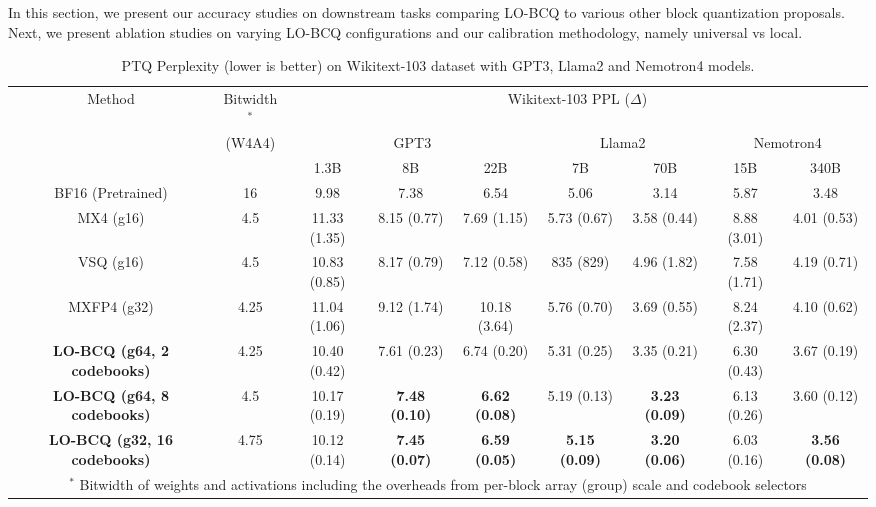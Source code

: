 In this section, we present our accuracy studies on downstream tasks comparing LO-BCQ to various other block quantization proposals. Next, we present ablation studies on varying LO-BCQ configurations and our calibration methodology, namely universal vs local.

\begin{table*} [!t]\scriptsize
\begin{center}
\caption{\label{tab:wiki3_ppl} \small PTQ Perplexity (lower is better) on Wikitext-103 dataset with GPT3, Llama2 and Nemotron4 models.}
\begin{tabular}{|c|c||c|c|c||c|c||c|c||} 
\hline
 Method & Bitwidth$^*$ & \multicolumn{7}{c||}{Wikitext-103 PPL ($\Delta$)} \\
  & (W4A4) &\multicolumn{3}{c||}{\cellcolor[gray]{0.95} GPT3} & \multicolumn{2}{c||}{\cellcolor[gray]{0.95} Llama2} & \multicolumn{2}{c||}{\cellcolor[gray]{0.95} Nemotron4} \\

 & & \cellcolor[gray]{0.95} 1.3B & \cellcolor[gray]{0.95} 8B & \cellcolor[gray]{0.95} 22B & \cellcolor[gray]{0.95} 7B & \cellcolor[gray]{0.95} 70B & \cellcolor[gray]{0.95} 15B & \cellcolor[gray]{0.95} 340B \\
 \hline
 BF16 (Pretrained) & 16 &  9.98 & 7.38 & 6.54 & 5.06 & 3.14 & 5.87 & 3.48 \\
\hline
MX4 (g16) & 4.5  & 11.33 (1.35) & 8.15 (0.77) & 7.69 (1.15) & 5.73 (0.67) & 3.58 (0.44) & 8.88 (3.01) & 4.01 (0.53) \\
VSQ (g16) & 4.5 & 10.83 (0.85) & 8.17 (0.79) & 7.12 (0.58) & 835 (829) & 4.96 (1.82) & 7.58 (1.71) & 4.19 (0.71) \\
MXFP4 (g32) & 4.25 & 11.04 (1.06) & 9.12 (1.74) & 10.18 (3.64) & 5.76 (0.70)& 3.69 (0.55) & 8.24 (2.37) & 4.10 (0.62) \\
\rowcolor[gray]{0.9} \textbf{LO-BCQ (g64, 2 codebooks)} & 4.25 & 10.40 (0.42) & 7.61 (0.23) & 6.74 (0.20) & 5.31 (0.25) & 3.35 (0.21) & 6.30 (0.43) & 3.67 (0.19) \\
\rowcolor[gray]{0.9} \textbf{LO-BCQ (g64, 8 codebooks)} & 4.5 & 10.17 (0.19) & \textbf{7.48 (0.10)} & \textbf{6.62 (0.08)} & 5.19 (0.13) & \textbf{3.23 (0.09)} & 6.13 (0.26) & 3.60 (0.12) \\
\rowcolor[gray]{0.9} \textbf{LO-BCQ (g32, 16 codebooks)} & 4.75 & 10.12 (0.14) & \textbf{7.45 (0.07)} & \textbf{6.59 (0.05)} & \textbf{5.15 (0.09)} & \textbf{3.20 (0.06)} & 6.03 (0.16) & \textbf{3.56 (0.08)} \\
\hline
\multicolumn{9}{c}{\scriptsize{$^*$ Bitwidth of weights and activations including the overheads from per-block array (group) scale and codebook selectors}} \\
\end{tabular}
\end{center}
\vspace{-0.3pt}
\end{table*}

